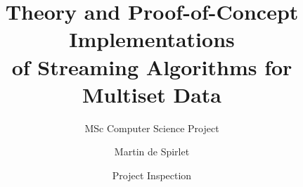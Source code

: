 \documentclass{beamer}
\title[Streaming Algorithms]{Theory and Proof-of-Concept Implementations \\ of Streaming Algorithms for Multiset Data}
\subtitle{MSc Computer Science Project}
\author{Martin de Spirlet}
\institute[]{University of Birmingham}
\date{Project Inspection}
\begin{document}
\begin{frame}
  \titlepage
\end{frame}
\end{document}
